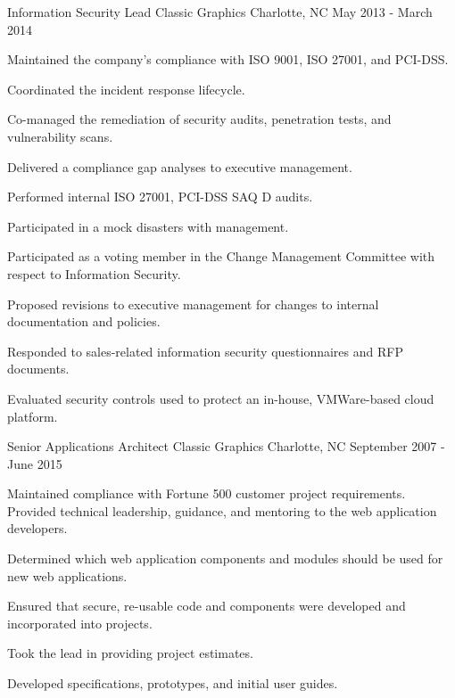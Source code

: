\begin{cventries}

\cventry
{Information Security Lead}
{Classic Graphics} %
{Charlotte, NC} %
{May 2013 - March 2014} %
{
Maintained the company's compliance with ISO 9001, ISO 27001, and PCI-DSS.
\begin{cvitems}
\item[]
\item {Coordinated the incident response lifecycle.}
\item {Co-managed the remediation of security audits, penetration tests, and vulnerability scans.}
\item {Delivered a compliance gap analyses to executive management.}
\item {Performed internal ISO 27001, PCI-DSS SAQ D audits.}
\item {Participated in a mock disasters with management.}
\item {Participated as a voting member in the Change Management Committee with respect to Information Security.}
\item {Proposed revisions to executive management for changes to internal documentation and policies.}
\item {Responded to sales-related information security questionnaires and RFP documents.}
\item {Evaluated security controls used to protect an in-house, VMWare-based cloud platform.}
\end{cvitems}
}


\cventry
{Senior Applications Architect}
{Classic Graphics} %
{Charlotte, NC} %
{September 2007 - June 2015} %
{
Maintained compliance with Fortune 500 customer project requirements. Provided technical leadership, guidance, and mentoring to the web application developers.
\begin{cvitems}
\item[]
\item {Determined which web application components and modules should be used for new web applications.}
\item {Ensured that secure, re-usable code and components were developed and incorporated into projects.}
\item {Took the lead in providing project estimates.}
\item {Developed specifications, prototypes, and initial user guides.}
\end{cvitems}
}


\end{cventries}
